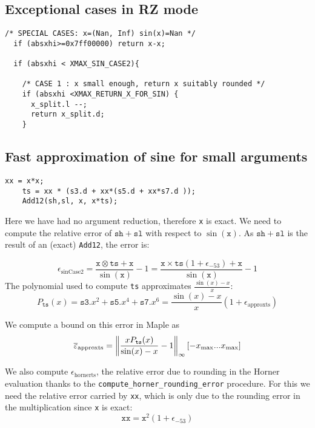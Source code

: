 \subsection{Exceptional cases in RZ mode}
\begin{lstlisting}[caption={Exceptional cases for sine RZ},firstnumber=1]
  /* SPECIAL CASES: x=(Nan, Inf) sin(x)=Nan */
  if (absxhi>=0x7ff00000) return x-x;    
  
  if (absxhi < XMAX_SIN_CASE2){

    /* CASE 1 : x small enough, return x suitably rounded */
    if (absxhi <XMAX_RETURN_X_FOR_SIN) {
      x_split.l --;
      return x_split.d;
    }
\end{lstlisting}
\subsection{Fast approximation of sine for small arguments \label{sec:trigo:fastsine}}

\begin{lstlisting}[caption={Sine, case 2},firstnumber=1]
    xx = x*x;
    ts = xx * (s3.d + xx*(s5.d + xx*s7.d ));
    Add12(sh,sl, x, x*ts);
\end{lstlisting}

Here we have had no argument reduction, therefore \texttt{x} is exact.
We need to compute the relative error of $\mathtt{sh}+\mathtt{sl}$
with respect to $\sin(\mathtt{x})$. As $\mathtt{sh}+\mathtt{sl}$ is
the result of an (exact) \texttt{Add12}, the error is:

\begin{equation}
  \epsilon_{\mathrm{sinCase2}} = \frac{\mathtt{x}\otimes \mathtt{ts} + \mathtt{x}}{\sin(\mathtt{x})} -1 = \frac{\mathtt{x}\times\mathtt{ts}(1+\epsilon_{-53}) + \mathtt{x}}{\sin(\mathtt{x})} -1
\label{eq:SinCase2Total}
\end{equation}
The polynomial used to compute \texttt{ts}
approximates $\frac{\sin(x)-x}{x}$: 
$$
P_{\mathtt{ts}}(x) = \mathtt{s3}.x^2 + \mathtt{s5}.x^4 + \mathtt{s7}.x^6
= \frac{\sin(x)-x}{x}(1+\epsilon_{\mathrm{approxts}})
$$

We compute a bound on this error in Maple as 
$${\overline{\varepsilon}}_{\mathrm{approxts}} = \left\Vert \frac{xP_{\mathtt{ts}}(x)}{\sin(x)-x} -1 \right\Vert_{\infty}[-x_{\mathrm{max}}...x_{\mathrm{max}}]$$

We also compute $\epsilon_{\mathrm{hornerts}}$, the relative error due
to rounding in the Horner evaluation thanks to the
\texttt{compute\_horner\_rounding\_error} procedure. For this we need
the relative error carried by \texttt{xx}, which is only due to the
rounding error in the multiplication since \texttt{x} is exact:
$$\mathtt{xx}=\mathtt{x}^2(1+\epsilon_{-53})$$

